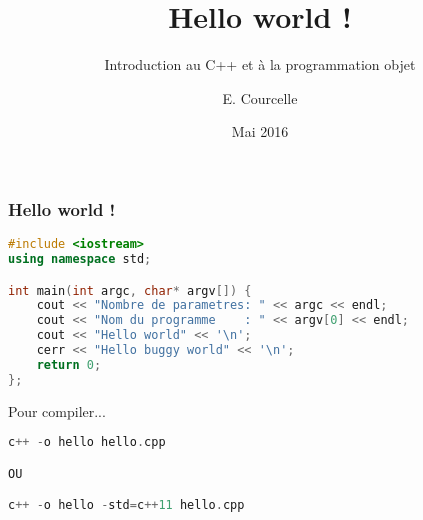 \documentclass{beamer}
\title{Hello world !}
\subtitle{Introduction au C++ et à la programmation objet}
\author{E. Courcelle}\institute{CALMIP, UMS 3669}
\date{Mai 2016}
\begin{document}
\begin{frame}
\titlepage
\end{frame}

\begin{frame}[fragile=singleslide,shrink=20]
\frametitle {Hello world !}
\begin{lstlisting}[language=c++]
#include <iostream>
using namespace std;

int main(int argc, char* argv[]) {
    cout << "Nombre de parametres: " << argc << endl;
    cout << "Nom du programme    : " << argv[0] << endl;
    cout << "Hello world" << '\n';
    cerr << "Hello buggy world" << '\n';
    return 0;
};
\end{lstlisting}

\begin{block}{Pour compiler...}
\begin{lstlisting}[language=c++]
c++ -o hello hello.cpp

OU

c++ -o hello -std=c++11 hello.cpp
\end{lstlisting}
\end{block}
\end{frame}
\end{document}
